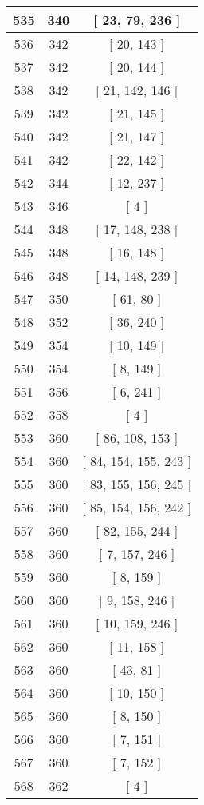 \begin{center}
\begin{longtable}[H]{|| c c c ||}
\hline
535 & 340 & [ 23, 79, 236 ] \\ 
\hline
536 & 342 & [ 20, 143 ] \\ 
\hline
537 & 342 & [ 20, 144 ] \\ 
\hline
538 & 342 & [ 21, 142, 146 ] \\ 
\hline
539 & 342 & [ 21, 145 ] \\ 
\hline
540 & 342 & [ 21, 147 ] \\ 
\hline
541 & 342 & [ 22, 142 ] \\ 
\hline
542 & 344 & [ 12, 237 ] \\ 
\hline
543 & 346 & [ 4 ] \\ 
\hline
544 & 348 & [ 17, 148, 238 ] \\ 
\hline
545 & 348 & [ 16, 148 ] \\ 
\hline
546 & 348 & [ 14, 148, 239 ] \\ 
\hline
547 & 350 & [ 61, 80 ] \\ 
\hline
548 & 352 & [ 36, 240 ] \\ 
\hline
549 & 354 & [ 10, 149 ] \\ 
\hline
550 & 354 & [ 8, 149 ] \\ 
\hline
551 & 356 & [ 6, 241 ] \\ 
\hline
552 & 358 & [ 4 ] \\ 
\hline
553 & 360 & [ 86, 108, 153 ] \\ 
\hline
554 & 360 & [ 84, 154, 155, 243 ] \\ 
\hline
555 & 360 & [ 83, 155, 156, 245 ] \\ 
\hline
556 & 360 & [ 85, 154, 156, 242 ] \\ 
\hline
557 & 360 & [ 82, 155, 244 ] \\ 
\hline
558 & 360 & [ 7, 157, 246 ] \\ 
\hline
559 & 360 & [ 8, 159 ] \\ 
\hline
560 & 360 & [ 9, 158, 246 ] \\ 
\hline
561 & 360 & [ 10, 159, 246 ] \\ 
\hline
562 & 360 & [ 11, 158 ] \\ 
\hline
563 & 360 & [ 43, 81 ] \\ 
\hline
564 & 360 & [ 10, 150 ] \\ 
\hline
565 & 360 & [ 8, 150 ] \\ 
\hline
566 & 360 & [ 7, 151 ] \\ 
\hline
567 & 360 & [ 7, 152 ] \\ 
\hline
568 & 362 & [ 4 ] \\ 
\hline

\end{longtable}
\end{center}
